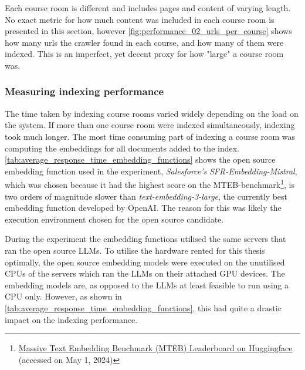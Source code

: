 


Each course room is different and includes pages and content of varying length. No exact metric for how much content was included in each course room is presented in this section, however \autoref{fig:performance_02_urls_per_course} shows how many urls the crawler found in each course, and how many of them were indexed. This is an imperfect, yet decent proxy for how "large" a course room was.





\subsubsection{Measuring indexing performance}
\label{sec:measuring_indexing_performance}


The time taken by indexing course rooms varied widely depending on the load on the system. If more than one course room were indexed simultaneously, indexing took much longer. The most time consuming part of indexing a course room was computing the embeddings for all documents added to the index. \autoref{tab:average_response_time_embedding_functions} shows the open source embedding function used in the experiment, \textit{Salesforce’s} \textit{SFR-Embedding-Mistral}\cite{meng_sfr-embedding-mistral_2024}, which was chosen because it had the highest score on the \gls{MTEB}-benchmark\footnote{\href{https://huggingface.co/spaces/mteb/leaderboard}{Massive Text Embedding Benchmark (MTEB) Leaderboard on Huggingface} (accessed on May 1, 2024)}, is two orders of magnitude slower than \textit{text-embedding-3-large}, the currently best embedding function developed by OpenAI. The reason for this was likely the execution environment chosen for the open source candidate.





During the experiment the embedding functions utilised the same servers that ran the open source \gls{LLM}s. To utilise the hardware rented for this thesis optimally, the open source embedding models were executed on the unutilised CPUs of the servers which ran the \gls{LLM}s on their attached GPU devices. The embedding models are, as opposed to the \gls{LLM}s at least feasible to run using a CPU only. However, as shown in \autoref{tab:average_response_time_embedding_functions}, this had quite a drastic impact on the indexing performance.


